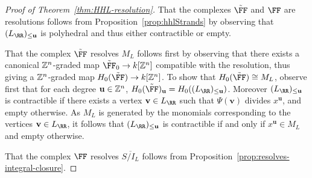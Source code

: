 \documentclass{amsart}
\begin{document}
\begin{proof}[Proof of Theorem~\ref{thm:HHL-resolution}]
  That the complexes $\tilde \FF$ and $\FF$ are resolutions follows from Proposition~\ref{prop:hhlStrands} by observing that $(L_{\RR})_{\leq \mathbf{u}}$ is polyhedral and thus either contractible or empty.

  That the complex $\tilde \FF$ resolves $M_L$ follows first by observing that there exists a canonical $\mathbb Z^n$-graded map $\tilde \FF_0\rightarrow k[\ZZ^n]$ compatible with the resolution, thus giving a $\mathbb Z^n$-graded map $H_0(\tilde \FF)\rightarrow k[\ZZ^n]$.
  To show that $H_0(\tilde \FF)\cong M_L$, observe first that for each degree $\mathbf{u}\in \mathbb Z^n$,
  $H_0(\tilde \FF)_{\mathbf{u}}=H_0((L_{\RR})_{\leq \mathbf{u}})$. Moreover $(L_{\RR})_{\leq \mathbf{u}}$ is contractible if there exists a vertex $\mathbf{v}\in L_{\RR}$ such that $\Psi(\mathbf{v})$ divides $x^{\mathbf{u}}$, and empty otherwise. As $M_L$ is generated by the monomials corresponding to the vertices $\mathbf{v}\in L_{\RR}$, it follows that $(L_{\RR})_{\leq \mathbf{u}}$ is contractible if and only if $x^{\mathbf{u}}\in M_L$ and empty otherwise.

  That the complex $\FF$ resolves $\overline{S/I_L}$ follows from Proposition~\ref{prop:resolves-integral-closure}.
\end{proof}

\ifdefined\whole
\else


\end{document}
